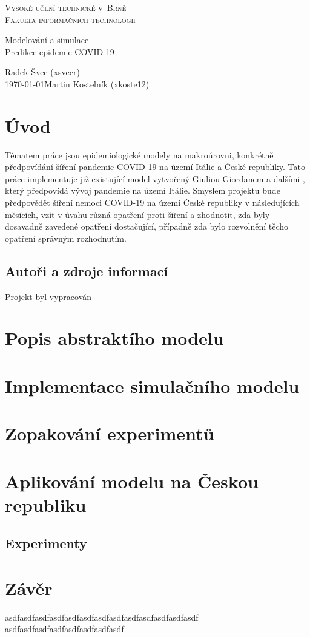 \documentclass[a4paper,11pt]{article}
\begin{document}
	\begin{titlepage}
		\begin{center}
			\textsc{\Huge Vysoké učení technické v~Brně\\
				\vspace{0.4em}\huge Fakulta informačních technologií}
			
			
			{\LARGE Modelování a simulace\\
				\Huge Predikce epidemie COVID-19\\ \vspace{0.3em}}
			
			
			{\Large \hfill Radek Švec (xsvecr)\\ \today \hfill Martin Kostelník (xkoste12)}
		\end{center}
	\end{titlepage}

	\section{Úvod}
		Tématem práce jsou epidemiologické modely na makroúrovni, konkrétně předpovídání šíření pandemie COVID-19 na území Itálie a České republiky. Tato práce implementuje již existující model vytvořený Giuliou Giordanem a dalšími \cite{source}, který předpovídá vývoj pandemie na území Itálie. Smyslem projektu bude předpovědět šíření nemoci COVID-19 na území České republiky v následujících měsících, vzít v úvahu různá opatření proti šíření a zhodnotit, zda byly dosavadně zavedené opatření dostačující, případně zda bylo rozvolnění těcho opatření správným rozhodnutím.
		
	\subsection{Autoři a zdroje informací}
		Projekt byl vypracován
			
	\section{Popis abstraktího modelu}
	\section{Implementace simulačního modelu}
	\section{Zopakování experimentů}
	\section{Aplikování modelu na Českou republiku}
	\subsection{Experimenty}
			
	\section{Závěr}
		asdfasdfasdfasdfasdfasdfasdfasdfasdfasdfasdfasdfasdf
		asdfasdfasdfasdfasdfasdfasdfasdf

	\newpage
	
	\renewcommand{\refname}{Literatura}
	
\end{document}
